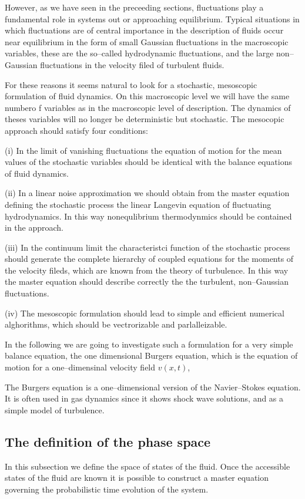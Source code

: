However, as we have seen in the preceeding sections, fluctuations play a
fundamental role in systems out or approaching equilibrium. Typical situations
in which fluctuations are of central importance in the description of fluids
occur near equilibrium in the form of small Gaussian fluctuations in the
macroscopic variables, these are the so--called hydrodynamic fluctuations,
and the large non--Gaussian fluctuations in the velocity filed of turbulent 
fluids.

For these reasons it seems natural to look for a  stochastic, mesoscopic
formulation of fluid dynamics. On this macroscopic level we will have the same
numbero f variables as in the macroscopic level of description. The dynamics
of theses variables will no longer be deterministic but stochastic. The
mesocopic approach should satisfy four conditions:

(i) In the limit of vanishing fluctuations the equation of motion for the 
mean values of the stochastic variables
should be identical with the balance equations of fluid dynamics.

(ii) In a linear noise approximation we should obtain from the master equation
defining the stochastic process the linear Langevin equation of fluctuating
hydrodynamics. In this way nonequlibrium thermodynmics should be contained in
the approach. 

(iii) In the continuum limit the characteristci function of the stochastic
process should generate the complete hierarchy of coupled equations for the
moments of the velocity fileds, which are known from the theory of
turbulence. In this way the master equation should describe correctly the the
turbulent, non--Gaussian fluctuations. 

(iv) The mesoscopic formulation should lead to simple and efficient numerical
alghorithms, which should be vectrorizable and parlalleizable.

In the  following we are going to investigate such a formulation for a very
simple balance equation, the one dimensional Burgers equation, which is the
equation of motion for a one--dimensinal velocity field $v(x,t)$,

The Burgers equation is a one--dimensional version of the Navier--Stokes
equation. It is often used in gas dynamics since it shows shock wave
solutions, and as a simple model of turbulence.

\subsection{The definition of the phase space}
In this subsection we define the space of
states of the fluid. Once the accessible states of the fluid
are known it
is possible to construct a master equation governing the
probabilistic
time evolution of the system. 

